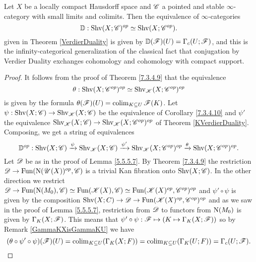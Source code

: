 \documentclass[../../thesis.tex]{subfiles}
\begin{document}
\begin{proposition}[{\cite[Proposition 5.5.5.10]{HA}}]
    Let $X$ be a locally compact Hausdorff space and $\mathscr{C}$ a pointed and stable $\infty$-category with small limits and colimits.
    Then the equivalence of $\infty$-categories
    \[
        \mathbb{D} : \mathrm{Shv}(X;\mathscr{C})^{op} \simeq \mathrm{Shv}(X;\mathscr{C}^{op}).
    \]
    given in Theorem \ref{VerdierDuality} is given by $\mathbb{D}(\mathscr{F})(U) = \Gamma_c(U;\mathscr{F})$, and this is the infinity-categorical generalization of the classical fact that conjugation by Verdier Duality exchanges cohomology and cohomology with compact support.
\end{proposition}
\begin{proof}
    It follows from the proof of Theorem \ref{7.3.4.9} that the equivalence
    \[
        \theta: \mathrm{Shv}(X;\mathscr{C}^{op})^{op} \simeq \mathrm{Shv}_{\mathscr{K}}(X;\mathscr{C}^{op})^{op}
    \]
    is given by the formula $\theta(\mathscr{F})(U) = \operatorname{colim}_{K\subseteq U}\mathscr{F}(K)$.
    Let $\psi: \mathrm{Shv}(X;\mathscr{C}) \to \mathrm{Shv}_{\mathscr{K}}(X;\mathscr{C})$ be the equivalence of Corollary \ref{7.3.4.10} and $\psi'$ the equivalence $\mathrm{Shv}_{\mathscr{K}}(X;\mathscr{C}) \to \mathrm{Shv}_{\mathscr{K}}(X;\mathscr{C}^{op})^{op}$ of Theorem \ref{KVerdierDuality}.
    Composing, we get a string of equivalences
    \[
        \mathbb{D}^{op} : \mathrm{Shv}(X;\mathscr{C}) \xrightarrow{\psi} \mathrm{Shv}_{\mathscr{K}}(X;\mathscr{C}) \xrightarrow{\psi'} \mathrm{Shv}_{\mathscr{K}}(X;\mathscr{C}^{op})^{op} \xrightarrow{\theta} \mathrm{Shv}(X;\mathscr{C}^{op})^{op}.
    \]
    Let $\mathscr{D}$ be as in the proof of Lemma \ref{5.5.5.7}.
    By Theorem \ref{7.3.4.9} the restriction $\mathscr{D}\to \mathrm{Fun}(\mathrm{N}(\mathscr{U}(X))^{op}, \mathscr{C})$ is a trivial Kan fibration onto $\mathrm{Shv}(X;\mathscr{C})$.
    In the other direction we restrict $\mathscr{D} \to \mathrm{Fun}(\mathrm{N}(M_0), \mathscr{C}) \simeq \mathrm{Fun}(\mathscr{K}(X), \mathscr{C}) \simeq \mathrm{Fun}(\mathscr{K}(X)^{op}, \mathscr{C}^{op})^{op}$ and $\psi' \circ \psi$ is given by the composition $\mathrm{Shv}(X;C) \to \mathscr{D} \to \mathrm{Fun}(\mathscr{K}(X)^{op}, \mathscr{C}^{op})^{op}$ and as we saw in the proof of Lemma \ref{5.5.5.7}, restriction from $\mathscr{D}$ to functors from $\mathrm{N}(M_0)$ is given by $\Gamma_K(X;\mathscr{F})$.
    This means that $\psi' \circ \psi : \mathscr{F} \mapsto \left( K \mapsto \Gamma_K(X;\mathscr{F}) \right)$ so by Remark \ref{GammaKXisGammaKU} we have
    \[
        (\theta \circ \psi' \circ \psi)(\mathscr{F})(U) = \operatorname{colim}_{K\subseteq U}(\Gamma_K(X;F)) = \operatorname{colim}_{K\subseteq U}(\Gamma_K(U;F)) = \Gamma_c(U;\mathscr{F}).
    \]
\end{proof}
\end{document}

